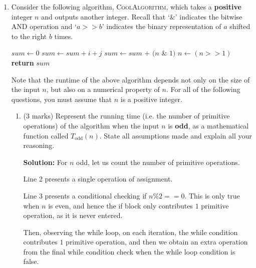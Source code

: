\documentclass[a4,13pt]{extarticle}
\newenvironment{Solution}{\color{blue}\textbf{Solution:}}{}
\begin{document}
\begin{enumerate}
	\item   
	      Consider the following algorithm, \textsc{CoolAlgorithm}, which takes a \textbf{positive} integer $n$ and outputs another integer. 
	      Recall that `$\&$' indicates the bitwise AND operation and `$a >> b$' indicates the binary representation of $a$ shifted to the right $b$ times.
	      	      
	      \begin{algorithm}
	      	\begin{algorithmic}[1]
	      		\State $sum \gets 0$
	      		\State $sum \gets sum + i + j$ 
	      		\EndFor 
	      		\EndFor
	      		\Else
	      		\State $sum \gets sum$ + $(n$ \& $1)$
	      		\State $n \gets (n >> 1)$
	      		\EndWhile
	      		\EndIf
	      		\State \textbf{return} $sum$
	      		\EndProcedure
	      	\end{algorithmic}
	      \end{algorithm}
	      	          
	      Note that the runtime of the above algorithm depends not only on the size of the input $n$, but also on a numerical property of $n$. 
	      For all of the following questions, you must assume that $n$ is a positive integer.
	      	      
	      \begin{enumerate}
	      	\item (3 marks) Represent the running time (i.e. the number of primitive operations) of the algorithm 
	      	      when the input $n$ is \textbf{odd}, as a mathematical function called $T_{\text{odd}}(n)$. State all assumptions made and explain all your reasoning.
	      	      
	      	      \begin{Solution}
For $n$ odd, let us count the number of primitive operations.

Line 2 presents a single operation of assignment.

Line 3 presents a conditional checking if $n \% 2 == 0$. This is only true when $n$ is even, and hence the if block only contributes $1$ primitive operation, as it is never entered.

Then, observing the while loop, on each iteration, the while condition contributes $1$ primitive operation, and then we obtain an extra operation from the final while condition check when the while loop condition is false.


\end{Solution}
\end{enumerate}
\end{enumerate}
\end{document}
